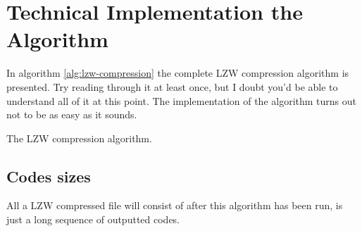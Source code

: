 \section{Technical Implementation the Algorithm}
\label{sec:lzw-enc-algorithm}

In algorithm \ref{alg:lzw-compression} the complete LZW compression
algorithm is presented. Try reading through it at least once,
but I doubt you'd be able to understand all of it at this point. The
implementation of the algorithm turns out not to be as easy as it
sounds.

\begin{algorithm}[H]
  \caption{The LZW compression algorithm.}
  \label{alg:lzw-compression}
  \begin{algorithmic}[1]

    \State {}

    \While{\neof}

       \label{algl:hasingcheckintable}
         \label{algl:hasgetcode}
      \Else
        \State {}


          \State {}\label{algl:hashadd}

        \EndIf


      \EndIf


    \EndWhile

    \State {}
    \State {}
    \State {}  \label{algl:flush}
  \end{algorithmic}
\end{algorithm}

\subsection{Codes sizes}

All a LZW compressed file will consist of after this algorithm has
been run, is just a long sequence of outputted codes.

